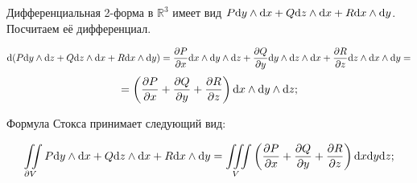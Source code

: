 \documentclass{article}
\begin{document}
	Дифференциальная 2-форма в $\mathbb{R}^3$ имеет вид $P\mathrm{d} y \land \mathrm{d} x + Q \mathrm{d} z \land \mathrm{d} x + R \mathrm{d} x \land \mathrm{d} y$. Посчитаем её дифференциал.

	\[\mathrm{d} (P\mathrm{d} y \land \mathrm{d} z + Q \mathrm{d} z \land \mathrm{d} x + R \mathrm{d} x \land \mathrm{d} y) = \frac{\partial P}{\partial x} \mathrm{d} x \land \mathrm{d} y \land \mathrm{d} z + \frac{\partial Q}{\partial y}\mathrm{d} y \land \mathrm{d} z \land \mathrm{d} x + \frac{\partial R}{\partial z} \mathrm{d} z \land \mathrm{d} x \land \mathrm{d} y  = \] \[ =\left( \frac{\partial P}{\partial x} + \frac{\partial Q}{\partial y} + \frac{\partial R}{\partial z} \right) \mathrm{d} x \land \mathrm{d} y \land \mathrm{d} z; \]

	Формула Стокса принимает следующий вид:

	\[\iint\limits_{\partial V} P\mathrm{d} y \land \mathrm{d} x + Q \mathrm{d} z \land \mathrm{d} x + R \mathrm{d} x \land \mathrm{d} y = \iiint\limits_{V}\left( \frac{\partial P}{\partial x} + \frac{\partial Q}{\partial y} + \frac{\partial R}{\partial z} \right) \mathrm{d} x\mathrm{d} y\mathrm{d} z; \]
\end{document}
